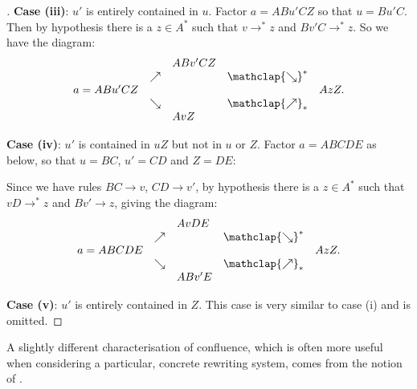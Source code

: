 \documentclass[noindex,noinsetproof,12pt]{lmaths}
\newcommand{\nearrowstar}{\mathclap{\nearrow}_{*}}
\newcommand{\searrowstar}{\mathclap{\searrow}^{*}}
\begin{document}
\begin{proof}[ ]
	\textbf{Case (iii)}: $u'$ is entirely contained in $u$. Factor $a = ABu'CZ$ so that $u = Bu'C$. Then by hypothesis there is a $z \in A^*$ such that $v \to^* z$ and $Bv'C \to^* z$. So we have the diagram: \[
		\begin{array}{lllll}
			& & ABv'CZ & & \\
			& \nearrow & & \searrowstar & \\
			a = ABu'CZ & & & & AzZ. \\
			& \searrow & & \nearrowstar & \\
			& & AvZ & &
		\end{array}
	\]

	\textbf{Case (iv)}: $u'$ is contained in $uZ$ but not in $u$ or $Z$. Factor $a = ABCDE$ as below, so that $u = BC$, $u' = CD$ and $Z = DE$:

	{\centering
	\par}

	Since we have rules $BC \to v$, $CD \to v'$, by hypothesis there is a $z \in A^*$ such that $vD \to^* z$ and $Bv' \to z$, giving the diagram: \[
		\begin{array}{lllll}
			& & AvDE & & \\
			& \nearrow & & \searrowstar & \\
			a = ABCDE & & & & AzZ. \\
			& \searrow & & \nearrowstar & \\
			& & ABv'E & &
		\end{array}
	\]

	\textbf{Case (v)}: $u'$ is entirely contained in $Z$. This case is very similar to case (i) and is omitted.
\end{proof}

A slightly different characterisation of confluence, which is often more useful when considering a particular, concrete rewriting system, comes from the notion of .
\end{document}
